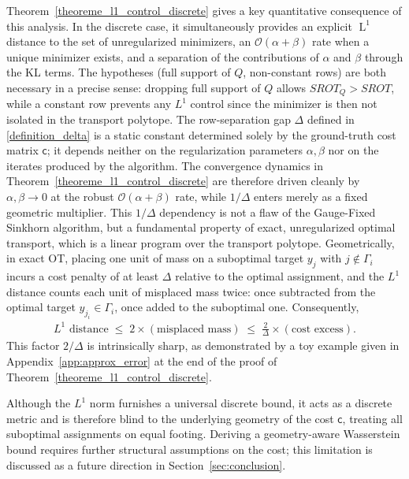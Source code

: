 \documentclass{article}
\begin{document}
Theorem~\ref{theoreme_l1_control_discrete} gives a key quantitative consequence of this analysis. In the discrete case, it simultaneously provides an explicit $\operatorname{L}^1$ distance to the set of unregularized minimizers, an $\mathcal{O}(\alpha + \beta)$ rate when a unique minimizer exists, and a separation of the contributions of $\alpha$ and $\beta$ through the KL terms. The hypotheses (full support of $Q$, non-constant rows) are both necessary in a precise sense: dropping full support of $Q$ allows $SROT_Q > SROT$, while a constant row prevents any $L^1$ control since the minimizer is then not isolated in the transport polytope. The row-separation gap $\Delta$ defined in \eqref{definition_delta} is a static constant determined solely by the ground-truth cost matrix $\mathsf{c}$; it depends neither on the regularization parameters $\alpha,\beta$ nor on the iterates produced by the algorithm. The convergence dynamics in Theorem~\ref{theoreme_l1_control_discrete} are therefore driven cleanly by $\alpha,\beta \to 0$ at the robust $\mathcal{O}(\alpha+\beta)$ rate, while $1/\Delta$ enters merely as a fixed geometric multiplier. This $1/\Delta$ dependency is not a flaw of the Gauge-Fixed Sinkhorn algorithm, but a fundamental property of exact, unregularized optimal transport, which is a linear program over the transport polytope. Geometrically, in exact OT, placing one unit of mass on a suboptimal target $y_j$ with $j \notin \Gamma_i$ incurs a cost penalty of at least $\Delta$ relative to the optimal assignment, and the $L^1$ distance counts each unit of misplaced mass twice: once subtracted from the optimal target $y_{j_i} \in \Gamma_i$, once added to the suboptimal one. Consequently,
\begin{align}
L^1\text{ distance} \;\leq\; 2 \times (\text{misplaced mass}) \;\leq\; \tfrac{2}{\Delta} \times (\text{cost excess}).
\end{align}
This factor $2/\Delta$ is intrinsically sharp, as demonstrated by a toy example given in Appendix~\ref{app:approx_error} at the end of the proof of Theorem~\ref{theoreme_l1_control_discrete}.

Although the $L^1$ norm furnishes a universal discrete bound, it acts as a discrete metric and is therefore blind to the underlying geometry of the cost $\mathsf{c}$, treating all suboptimal assignments on equal footing. Deriving a geometry-aware Wasserstein bound requires further structural assumptions on the cost; this limitation is discussed as a future direction in Section~\ref{sec:conclusion}.
\end{document}
